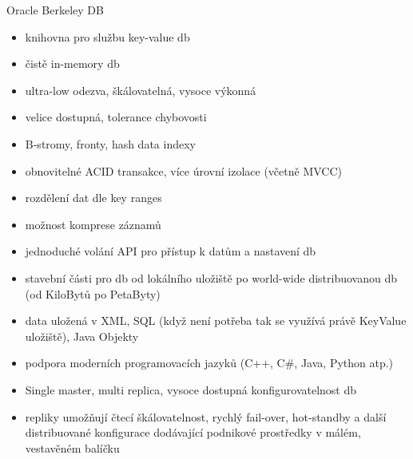 \documentclass{article}
\begin{document}
	\begin{subsubsection}{Oracle Berkeley DB}
		\begin{itemize}
			\item knihovna pro službu key-value db
			\item čistě in-memory db
			\item ultra-low odezva, škálovatelná, vysoce výkonná
			\item velice dostupná, tolerance chybovosti
			\item B-stromy, fronty, hash data indexy
			\item obnovitelné ACID transakce, více úrovní izolace (včetně MVCC)
			\item rozdělení dat dle key ranges
			\item možnost komprese záznamů
			\item jednoduché volání API pro přístup k datům a nastavení db
			\item stavební části pro  db od lokálního uložiště po world-wide distribuovanou db (od KiloBytů po PetaByty)
			\item data uložená v XML, SQL (když není potřeba tak se využívá právě KeyValue uložiště), Java Objekty
			\item podpora moderních programovacích jazyků (C++, C\#, Java, Python atp.)
			\item Single master, multi replica, vysoce dostupná konfigurovatelnost db
			\item repliky umožňují čtecí škálovatelnost, rychlý fail-over, hot-standby a další distribuované konfigurace dodávající podnikové prostředky v málém, vestavěném balíčku
		\end{itemize}
	\end{subsubsection}
\end{document}
